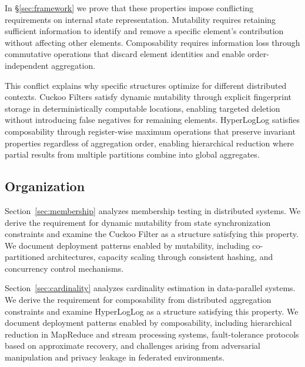 In \S\ref{sec:framework} we prove that these properties impose conflicting requirements on internal state representation. Mutability requires retaining sufficient information to identify and remove a specific element's contribution without affecting other elements. Composability requires information loss through commutative operations that discard element identities and enable order-independent aggregation.

This conflict explains why specific structures optimize for different distributed contexts. Cuckoo Filters satisfy dynamic mutability through explicit fingerprint storage in deterministically computable locations, enabling targeted deletion without introducing false negatives for remaining elements. HyperLogLog satisfies composability through register-wise maximum operations that preserve invariant properties regardless of aggregation order, enabling hierarchical reduction where partial results from multiple partitions combine into global aggregates.


\subsection{Organization}

Section~\ref{sec:membership} analyzes membership testing in distributed systems. We derive the requirement for dynamic mutability from state synchronization constraints and examine the Cuckoo Filter as a structure satisfying this property. We document deployment patterns enabled by mutability, including co-partitioned architectures, capacity scaling through consistent hashing, and concurrency control mechanisms.

Section~\ref{sec:cardinality} analyzes cardinality estimation in data-parallel systems. We derive the requirement for composability from distributed aggregation constraints and examine HyperLogLog as a structure satisfying this property. We document deployment patterns enabled by composability, including hierarchical reduction in MapReduce and stream processing systems, fault-tolerance protocols based on approximate recovery, and challenges arising from adversarial manipulation and privacy leakage in federated environments.

